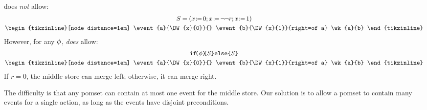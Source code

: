 \begin{example}
  \label{ex:if1}
   does \emph{not} allow:
  \begin{gather*}
    \aCmd=\PBR{
      \PW{x}{0}\SEMI
      \PW{x}{\BANG\BANG r}\SEMI
      \PW{x}{1}
    }
    \\
    \hbox{\begin{tikzinline}[node distance=1em]
        \event{a}{\DW{x}{0}}{}
        \event{b}{\DW{x}{1}}{right=of a}
        \wk{a}{b}
      \end{tikzinline}}
  \end{gather*}
  However, for any $\phi$,  \emph{does} allow:
  \begin{gather*}
    \IF{\aForm}\THEN\aCmd\ELSE\aCmd\FI
    \\
    \hbox{\begin{tikzinline}[node distance=1em]
        \event{a}{\DW{x}{0}}{}
        \event{b}{\DW{x}{1}}{right=of a}
        \wk{a}{b}
      \end{tikzinline}}
  \end{gather*}
  If $r=0$, the middle store can merge left; otherwise, it can merge right.
\end{example}

The difficulty is that any pomset can contain at most one event for the
middle store.  Our solution is to allow a pomset to contain many events for a
single action, as long as the events have disjoint preconditions.

